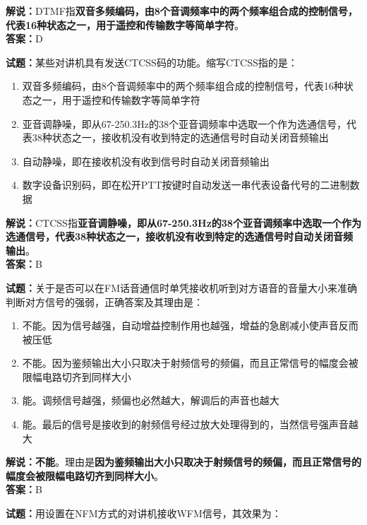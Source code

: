 \documentclass{ctexbook}
\begin{document}
\noindent\textbf{解说：}DTMF指\textbf{双音多频编码，由8个音调频率中的两个频率组合成的控制信号，代表16种状态之一，用于遥控和传输数字等简单字符}。\\\noindent\textbf{答案：}D

\bigskip

\noindent\textbf{试题：}某些对讲机具有发送CTCSS码的功能。缩写CTCSS指的是：

\begin{enumerate}[leftmargin=3em]
  \item 双音多频编码，由8个音调频率中的两个频率组合成的控制信号，代表16种状态之一，用于遥控和传输数字等简单字符
  \item 亚音调静噪，即从67-250.3Hz的38个亚音调频率中选取一个作为选通信号，代表38种状态之一，接收机没有收到特定的选通信号时自动关闭音频输出
  \item 自动静噪，即在接收机没有收到信号时自动关闭音频输出
  \item 数字设备识别码，即在松开PTT按键时自动发送一串代表设备代号的二进制数据
\end{enumerate}

\noindent\textbf{解说：}CTCSS指\textbf{亚音调静噪，即从67-250.3Hz的38个亚音调频率中选取一个作为选通信号，代表38种状态之一，接收机没有收到特定的选通信号时自动关闭音频输出}。\\\noindent\textbf{答案：}B

\bigskip

\noindent\textbf{试题：}关于是否可以在FM话音通信时单凭接收机听到对方语音的音量大小来准确判断对方信号的强弱，正确答案及其理由是：

\begin{enumerate}[leftmargin=3em]
  \item 不能。因为信号越强，自动增益控制作用也越强，增益的急剧减小使声音反而被压低
  \item 不能。因为鉴频输出大小只取决于射频信号的频偏，而且正常信号的幅度会被限幅电路切齐到同样大小
  \item 能。调频信号越强，频偏也必然越大，解调后的声音也越大
  \item 能。最后的信号是接收到的射频信号经过放大处理得到的，当然信号强声音越大
\end{enumerate}

\noindent\textbf{解说：}\textbf{不能}。理由是\textbf{因为鉴频输出大小只取决于射频信号的频偏，而且正常信号的幅度会被限幅电路切齐到同样大小}。\\\noindent\textbf{答案：}B

\bigskip

\noindent\textbf{试题：}用设置在NFM方式的对讲机接收WFM信号，其效果为：
\end{document}
